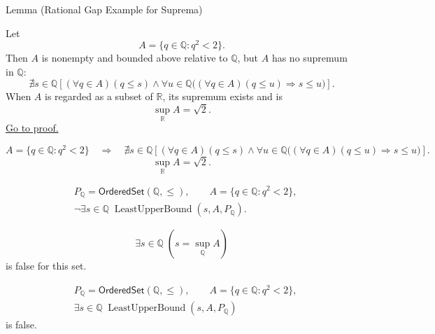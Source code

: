 \begin{lemmabox}{Lemma (Rational Gap Example for Suprema)}
\begin{lemma}
\label{lem:rational-gap-suprema}
Let
\[
  A=\{q\in\mathbb{Q}:q^2<2\}.
\]
Then $A$ is nonempty and bounded above relative to $\mathbb{Q}$, but $A$ has
no supremum in $\mathbb{Q}$:
\[
  \nexists s\in\mathbb{Q}\left[
  (\forall q\in A)(q\leq s)
  \land
  \forall u\in\mathbb{Q}
  \bigl((\forall q\in A)(q\leq u)\Longrightarrow s\leq u\bigr)
  \right].
\]
When $A$ is regarded as a subset of $\mathbb{R}$, its supremum exists and is
\[
  \sup_{\mathbb{R}}A=\sqrt{2}.
\]
\hyperref[prf:rational-gap-suprema]{Go to proof.}
\end{lemma}
\end{lemmabox}

\begin{remark*}
\[
A=\{q\in\mathbb{Q}:q^2<2\}
\quad\Longrightarrow\quad
\nexists s\in\mathbb{Q}\left[
(\forall q\in A)(q\leq s)
\land
\forall u\in\mathbb{Q}
\bigl((\forall q\in A)(q\leq u)\Longrightarrow s\leq u\bigr)
\right].
\]
\[
\sup_{\mathbb{R}}A=\sqrt{2}.
\]
\end{remark*}

\begin{remark*}
\[
\begin{aligned}
&P_{\mathbb{Q}}=\mathsf{OrderedSet}(\mathbb{Q},\leq),\qquad
A=\{q\in\mathbb{Q}:q^2<2\},\\
&\neg\exists s\in\mathbb{Q}\;\operatorname{LeastUpperBound}(s,A,P_{\mathbb{Q}}).
\end{aligned}
\]
\end{remark*}

\begin{remark*}
\[
\exists s\in\mathbb{Q}\;(s=\sup_{\mathbb{Q}}A)
\]
is false for this set.
\end{remark*}

\begin{remark*}
\[
\begin{aligned}
&P_{\mathbb{Q}}=\mathsf{OrderedSet}(\mathbb{Q},\leq),\qquad
A=\{q\in\mathbb{Q}:q^2<2\},\\
&\exists s\in\mathbb{Q}\;\operatorname{LeastUpperBound}(s,A,P_{\mathbb{Q}})
\end{aligned}
\]
is false.
\end{remark*}

